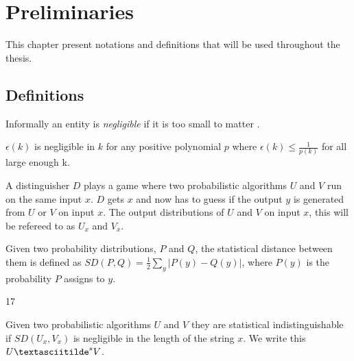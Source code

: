 \chapter{Preliminaries}
\label{cha:Preliminaries and Definitions}

This chapter present notations and definitions that will be used throughout the thesis.

\section{Definitions}
Informally an entity is \emph{negligible} if it is too small to matter \cite{commitment}.

\begin{mydef}[Negligible]
$\epsilon(k)$ is negligible in $k$ for any positive polynomial $p$ where $\epsilon(k)\leq\frac{1}{p(k)}$ for all large enough k. 
\end{mydef}

A distinguisher $D$ plays a game where two probabilistic algorithms $U$ and $V$ run on the same input $x$. $D$ gets $x$ and now has to guess if the output $y$ is generated from $U$ or $V$ on input $x$. The output  distributions of $U$ and $V$ on input $x$, this will be refereed to as $U_x$ and $V_x$.

\begin{mydef}
Given two probability distributions, $P$ and $Q$, the statistical distance between them is defined as $SD(P,Q)=\frac{1}{2}\sum_{y}|P(y)-Q(y)|$, where $P(y)$ is the probability $P$ assigns to $y$.
\end{mydef}
17


\begin{mydef}
Given two probabilistic algorithms $U$ and $V$ they are statistical indistinguishable if $SD(U_x, V_x)$ is negligible in the length of the string $x$. We write this $U \textasciitilde^s V$.
\end{mydef}


